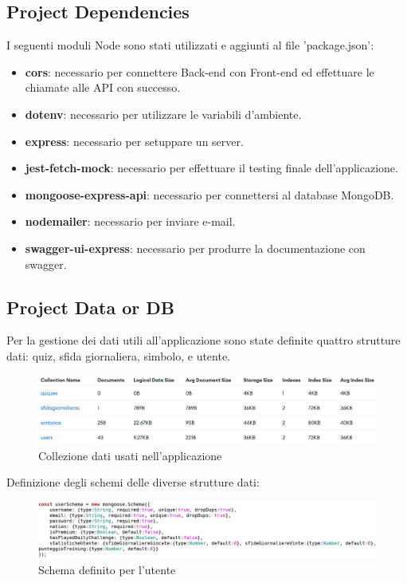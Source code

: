\subsection{Project Dependencies}
I seguenti moduli Node sono stati utilizzati e aggiunti al file 'package.json': 
\begin{itemize}
    \item \textbf{cors}: necessario per connettere Back-end con Front-end ed effettuare le chiamate alle API con successo.
    \item \textbf{dotenv}: necessario per utilizzare le variabili d'ambiente.
    \item \textbf{express}: necessario per setuppare un server.
    \item \textbf{jest-fetch-mock}: necessario per effettuare il testing finale dell'applicazione.
    \item \textbf{mongoose-express-api}: necessario per connettersi al database MongoDB.
    \item \textbf{nodemailer}: necessario per inviare e-mail.
    \item \textbf{swagger-ui-express}: necessario per produrre la documentazione con swagger.
\end{itemize}

\subsection{Project Data or DB}
Per la gestione dei dati utili all’applicazione sono state definite quattro strutture dati: quiz, sfida giornaliera, simbolo, e utente.
\begin{figure}[!h]
\centering
\includegraphics[scale=0.35]{images/project_data_db.jpg}
\caption{Collezione dati usati nell'applicazione}
\label{fig:struttura_front-end}
\end{figure}
\noindent

\newpage
\noindent
Definizione degli schemi delle diverse strutture dati:
\begin{figure}[!h]
\centering
\includegraphics[scale=0.35]{images/user_schema_db.jpg}
\caption{Schema definito per l'utente}
\label{fig:user_schema_db}
\end{figure}
\noindent

